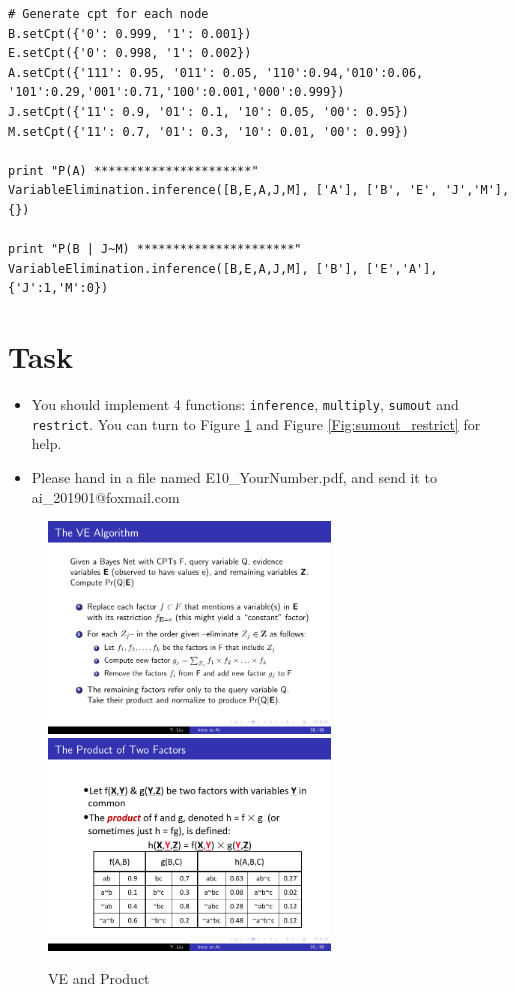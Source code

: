 \documentclass[a4paper, 11pt]{article}
\begin{document}
\begin{lstlisting}
# Generate cpt for each node
B.setCpt({'0': 0.999, '1': 0.001})
E.setCpt({'0': 0.998, '1': 0.002})
A.setCpt({'111': 0.95, '011': 0.05, '110':0.94,'010':0.06,
'101':0.29,'001':0.71,'100':0.001,'000':0.999})
J.setCpt({'11': 0.9, '01': 0.1, '10': 0.05, '00': 0.95})
M.setCpt({'11': 0.7, '01': 0.3, '10': 0.01, '00': 0.99})

print "P(A) **********************"
VariableElimination.inference([B,E,A,J,M], ['A'], ['B', 'E', 'J','M'], {})

print "P(B | J~M) **********************"
VariableElimination.inference([B,E,A,J,M], ['B'], ['E','A'], {'J':1,'M':0})
\end{lstlisting}

\section{Task}
\begin{itemize}
\item You should implement 4 functions: \texttt{inference}, \texttt{multiply}, \texttt{sumout} and \texttt{restrict}. You can turn to Figure \ref{Fig:ve_product} and Figure \ref{Fig:sumout_restrict} for help.
\item Please hand in a file named \textsf{E10\_YourNumber.pdf}, and send it to \textsf{ai\_201901@foxmail.com}
\end{itemize}

\begin{figure}[ht]{}
\centering
\includegraphics[width=7.5cm]{fig/ve}
\qquad
\includegraphics[width=7.5cm]{fig/product}
\caption{VE and Product}
\label{Fig:ve_product}
\end{figure}
\end{document}
